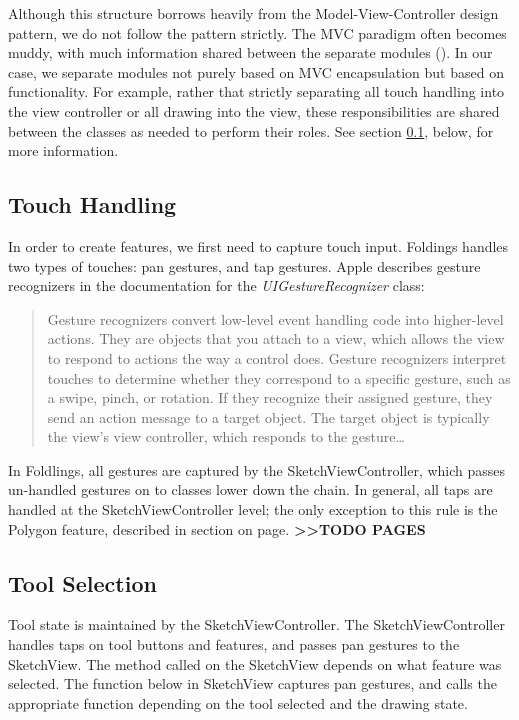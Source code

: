 Although this structure borrows heavily from the Model-View-Controller
design pattern, we do not follow the pattern strictly. The MVC paradigm
often becomes muddy, with much information shared between the separate
modules (\citet{veit2003model}). In our case, we separate modules not
purely based on MVC encapsulation but based on functionality. For
example, rather that strictly separating all touch handling into the
view controller or all drawing into the view, these responsibilities are
shared between the classes as needed to perform their roles. See section
\ref{touch-handling}, below, for more information.

\subsection{Touch Handling}\label{touch-handling}

In order to create features, we first need to capture touch input.
Foldings handles two types of touches: pan gestures, and tap gestures.
Apple describes gesture recognizers in the documentation for the
\emph{UIGestureRecognizer} class:

\begin{quote}
Gesture recognizers convert low-level event handling code into
higher-level actions. They are objects that you attach to a view, which
allows the view to respond to actions the way a control does. Gesture
recognizers interpret touches to determine whether they correspond to a
specific gesture, such as a swipe, pinch, or rotation. If they recognize
their assigned gesture, they send an action message to a target object.
The target object is typically the view's view controller, which
responds to the gesture\ldots{}
\end{quote}

In Foldlings, all gestures are captured by the SketchViewController,
which passes un-handled gestures on to classes lower down the chain. In
general, all taps are handled at the SketchViewController level; the
only exception to this rule is the Polygon feature, described in section
on page. \textbf{\textgreater{}\textgreater{}TODO PAGES}

\subsection{Tool Selection}\label{tool-selection}

Tool state is maintained by the SketchViewController. The
SketchViewController handles taps on tool buttons and features, and
passes pan gestures to the SketchView. The method called on the
SketchView depends on what feature was selected. The function below in
SketchView captures pan gestures, and calls the appropriate function
depending on the tool selected and the drawing state.

